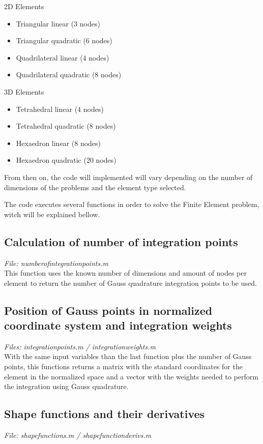 \documentclass[paper=a4, fontsize=11pt]{article} %
\numberwithin{equation}{section} %
\numberwithin{figure}{section} %
\numberwithin{table}{section} %
\begin{document}
2D Elements
\begin{itemize}
\item Triangular linear (3 nodes)
\item Triangular quadratic (6 nodes)
\item Quadrilateral linear (4 nodes)
\item Quadrilateral quadratic (8 nodes)
\end{itemize}
3D Elements
\begin{itemize}
\item Tetrahedral linear (4 nodes)
\item Tetrahedral quadratic (8 nodes)
\item Hexaedron linear (8 nodes)
\item Hexaedron quadratic (20 nodes)
\end{itemize}

From then on, the code will implemented will vary depending on the number of dimensions of the problems and the element type selected. 

The code executes several functions in order to solve the Finite Element problem, witch will be explained bellow.

\subsection{\textbf{Calculation of number of integration points}}
\textit{File: numberofintegrationpoints.m}\\

This function uses the known number of dimensions and amount of nodes per element to return the number of Gauss quadrature integration points to be used.

\subsection{\textbf{Position of Gauss points in normalized coordinate system and integration weights}}
\textit{Files: integrationpoints.m / integrationweights.m}\\

With the same input variables than the last function plus the number of Gauss points, this functions returns a matrix with the standard coordinates for the element in the normalized space and a vector with the weights needed to perform the integration using Gauss quadrature.

\subsection{\textbf{Shape functions and their derivatives}}
\textit{File: shapefunctions.m / shapefunctionderivs.m }\\
\end{document}
